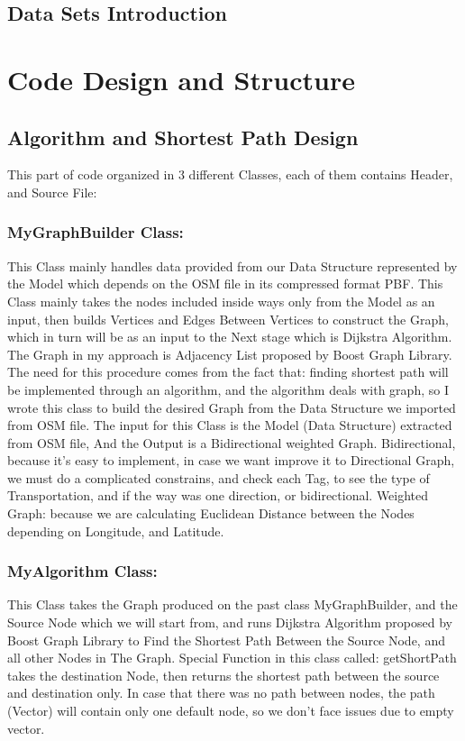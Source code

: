 \documentclass[a4paper,english]{book}
\begin{document}
\section{Data Sets Introduction}
\chapter{Code Design and Structure}
\section{Algorithm and Shortest Path Design}
This part of code organized in 3 different Classes, each of them contains Header, and Source File:
\subsection{ MyGraphBuilder Class:}
This Class mainly handles data provided from our Data Structure represented by the Model which depends on the OSM file in its compressed format PBF.
This Class mainly takes the nodes included inside ways only from the
Model as an input, then builds Vertices and Edges Between Vertices to construct the Graph, which in turn will be as an input to the Next stage which is Dijkstra Algorithm.
The Graph in my approach is Adjacency List proposed by Boost Graph Library.
The need for this procedure comes from the fact that: finding shortest path will be implemented through an algorithm, and the algorithm deals with graph, so I wrote this class to build the desired Graph from the Data Structure we imported from OSM file.
The input for this Class is the Model (Data Structure) extracted from OSM file, 
And the Output is a Bidirectional weighted Graph.
Bidirectional, because it’s easy to implement, in case we want improve it to Directional Graph, we must do a complicated constrains, and check each Tag, to see the type of Transportation, and if the way was one direction, or bidirectional.
Weighted Graph: because we are calculating Euclidean Distance between the Nodes depending on Longitude, and Latitude.
\subsection{ MyAlgorithm Class:}
This Class takes the Graph produced on the past class MyGraphBuilder, and the Source Node which we will start from, and runs Dijkstra Algorithm proposed by Boost Graph Library to Find the Shortest Path Between the Source Node, and all other Nodes in The Graph.
Special Function in this class called: getShortPath takes the destination Node, then returns the shortest path between the source and destination only.
In case that there was no path between nodes, the path (Vector) will contain only one default node, so we don’t face issues due to empty vector.
\end{document}
